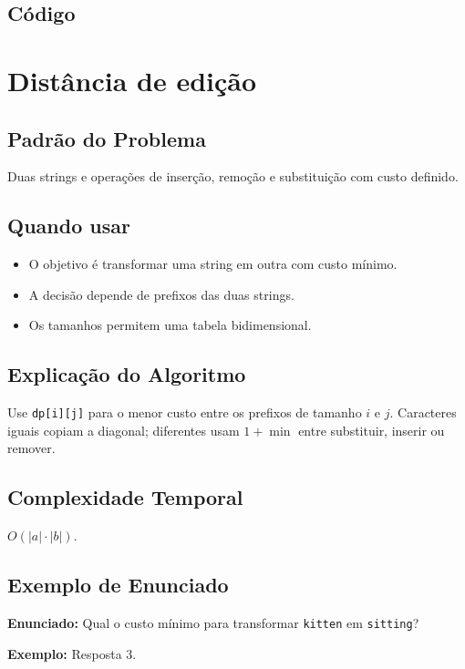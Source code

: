 \subsection{Código}

\section{Distância de edição}

\subsection{Padrão do Problema}
Duas strings e operações de inserção, remoção e substituição com custo definido.

\subsection{Quando usar}
\begin{itemize}[nosep]
  \item O objetivo é transformar uma string em outra com custo mínimo.
  \item A decisão depende de prefixos das duas strings.
  \item Os tamanhos permitem uma tabela bidimensional.
\end{itemize}

\subsection{Explicação do Algoritmo}
Use \texttt{dp[i][j]} para o menor custo entre os prefixos de tamanho $i$ e $j$. Caracteres iguais copiam a diagonal; diferentes usam $1 + \min$ entre substituir, inserir ou remover.

\subsection{Complexidade Temporal}
$O(|a| \cdot |b|)$.

\subsection{Exemplo de Enunciado}
\begin{exemplodiabox}
\textbf{Enunciado:} Qual o custo mínimo para transformar \texttt{kitten} em \texttt{sitting}?

\textbf{Exemplo:} Resposta $3$.
\end{exemplodiabox}

